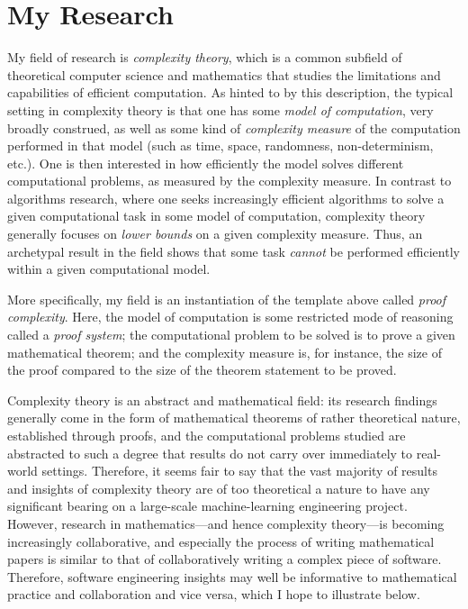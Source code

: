 \section*{My Research}
My field of research is \emph{complexity theory}, which is a common subfield of theoretical computer science and mathematics that studies the limitations and capabilities of efficient computation. As hinted to by this description, the typical setting in complexity theory is that one has some \emph{model of computation}, very broadly construed, as well as some kind of \emph{complexity measure} of the computation performed in that model (such as time, space, randomness, non-determinism, etc.). One is then interested in how efficiently the model solves different computational problems, as measured by the complexity measure. In contrast to algorithms research, where one seeks increasingly efficient algorithms to solve a given computational task in some model of computation, complexity theory generally focuses on \emph{lower bounds} on a given complexity measure. Thus, an archetypal result in the field shows that some task \emph{cannot} be performed efficiently within a given computational model. 

More specifically, my field is an instantiation of the template above called \emph{proof complexity}. Here, the model of computation is some restricted mode of reasoning called a \emph{proof system}; the computational problem to be solved is to prove a given mathematical theorem; and the complexity measure is, for instance, the size of the proof compared to the size of the theorem statement to be proved.  

Complexity theory is an abstract and mathematical field: its research findings generally come in the form of mathematical theorems of rather theoretical nature, established through proofs, and the computational problems studied are abstracted to such a degree that results do not carry over immediately to real-world settings. Therefore, it seems fair to say that the vast majority of results and insights of complexity theory are of too theoretical a nature to have any significant bearing on a large-scale machine-learning engineering project.  However, research in mathematics---and hence complexity theory---is becoming increasingly collaborative, and especially the process of writing mathematical papers is similar to that of collaboratively writing a complex piece of software. Therefore, software engineering insights may well be informative to mathematical practice and collaboration and vice versa, which I hope to illustrate below.

